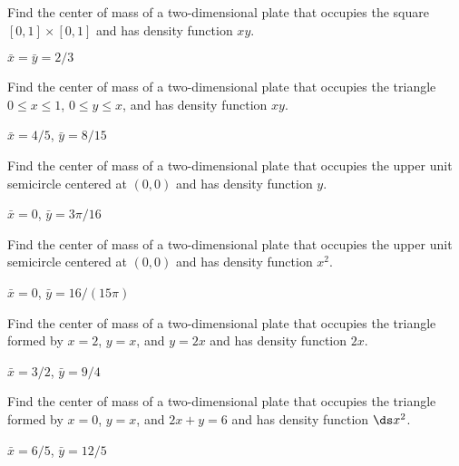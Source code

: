 \begin{exercises}

\begin{exercise} Find the center of mass of a two-dimensional plate 
that occupies the square $[0,1]\times[0,1]$
and has density
function $xy$.
\begin{answer} $\bar x=\bar y=2/3$
\end{answer}\end{exercise}

\begin{exercise} Find the center of mass of a two-dimensional plate 
that occupies the triangle $0\le x\le1$, $0\le y\le x$,
and has density
function $xy$.
\begin{answer} $\bar x=4/5$, $\bar y=8/15$
\end{answer}\end{exercise}

\begin{exercise} Find the center of mass of a two-dimensional plate 
that occupies the upper unit semicircle centered at $(0,0)$
and has density
function $y$.
\begin{answer} $\bar x=0$, $\bar y=3\pi/16$
\end{answer}\end{exercise}

\begin{exercise} Find the center of mass of a two-dimensional plate 
that occupies the upper unit semicircle centered at $(0,0)$
and has density
function $x^2$.
\begin{answer} $\bar x=0$, $\bar y=16/(15\pi)$
\end{answer}\end{exercise}

\begin{exercise} Find the center of mass of a two-dimensional plate 
that occupies the triangle formed by $x=2$, $y=x$, and $y=2x$
and has density
function $2x$.
\begin{answer} $\bar x=3/2$, $\bar y=9/4$
\end{answer}\end{exercise}

\begin{exercise} Find the center of mass of a two-dimensional plate 
that occupies the triangle formed by $x=0$, $y=x$, and $2x+y=6$
and has density
function $\ds x^2$.
\begin{answer} $\bar x=6/5$, $\bar y=12/5$
\end{answer}\end{exercise}


\end{exercises}
